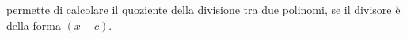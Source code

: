 permette di calcolare il quoziente della divisione tra due polinomi,
se il divisore è della forma $(x-c)$.
